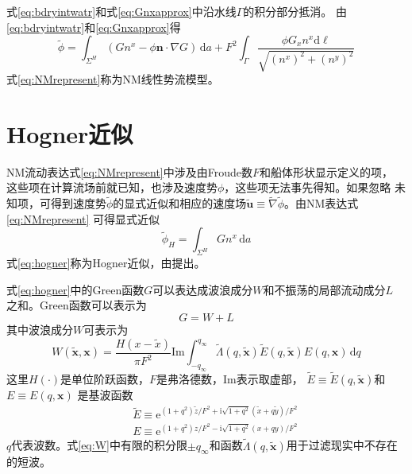 式\eqref{eq:bdryintwatr}和式\eqref{eq:Gnxapprox}中沿水线$\Gamma$的积分部分抵消。
由\eqref{eq:bdryintwatr}和\eqref{eq:Gnxapprox}得
\begin{equation}
  \tilde{\phi}=\int_{\Sigma^H}(Gn^x-\phi\mathbf{n}\cdot\nabla G)\,\mathrm{d}a
  +F^2\int_{\Gamma}
  \frac{\phi G_x n^x\mathrm{d}\ell}{\sqrt{(n^x)^2+(n^y)^2}}
  \label{eq:NMrepresent}
\end{equation}
式\eqref{eq:NMrepresent}称为NM线性势流模型\supercite{Noblesse2013Neumann}。

\section{Hogner近似}
\label{sec:hognerapprox}
NM流动表达式\eqref{eq:NMrepresent}中涉及由Froude数$F$和船体形状显示定义的项，
这些项在计算流场前就已知，也涉及速度势$\phi$，这些项无法事先得知。如果忽略
未知项，可得到速度势$\tilde\phi$的显式近似和相应的速度场$\widetilde{\mathbf{u}}\equiv\widetilde{\nabla}\tilde{\phi}$。由NM表达式\eqref{eq:NMrepresent}
可得显式近似
\begin{equation}
  \tilde\phi_H=\int_{\Sigma^H}Gn^x\,\mathrm{d}a
  \label{eq:hogner}
\end{equation}
式\eqref{eq:hogner}称为Hogner近似，由\parencite{Hogner1932Hydromech}提出。


式\eqref{eq:hogner}中的Green函数$G$可以表达成波浪成分$W$和不振荡的局部流动成分$L$
之和。Green函数可以表示为
\begin{equation}
  G=W+L
  \label{eq:gwl}
\end{equation}
其中波浪成分$W$可表示为
\begin{equation}
  W(\tilde{\mathbf{x}},\mathbf{x})=\frac{H(x-\tilde{x})}{\pi {{F}^{2}}}\mathrm{Im}\int_{-{{q}_{\infty }}}^{{{q}_{\infty }}}{\tilde{\Lambda }(q,\tilde{\mathbf{x}})\tilde{E}(q,\tilde{\mathbf{x}})E(q,\mathbf{x})}\,\mathrm{d}q
  \label{eq:W}
\end{equation}
这里$H(\cdot)$是单位阶跃函数，$F$是弗洛德数，$\mathrm{Im}$表示取虚部， 
$\tilde{E}\equiv\tilde{E}(q,\tilde{\mathbf{x}})$和$E\equiv E(q,\mathbf{x})$
是基波函数
\begin{eqnarray}
  &&\tilde{E}\equiv \mathrm{e}^{(1+q^2)\tilde{z}/F^2+\mathrm{i}\sqrt{1+q^2}(\tilde{x}+q\tilde{y})/F^2}\label{eq:Etilde}\\
  && E\equiv \mathrm{e}^{(1+q^2)z/F^2-\mathrm{i}\sqrt{1+q^2}(x+qy)/F^2}
  \label{eq:E}
\end{eqnarray}
$q$代表波数。式\eqref{eq:W}中有限的积分限$\pm q_{\infty}$和函数$\tilde{\Lambda}(q,\tilde{\mathbf{x}})$用于过滤现实中不存在的短波\supercite{Noblesse2013Evaluation}。

